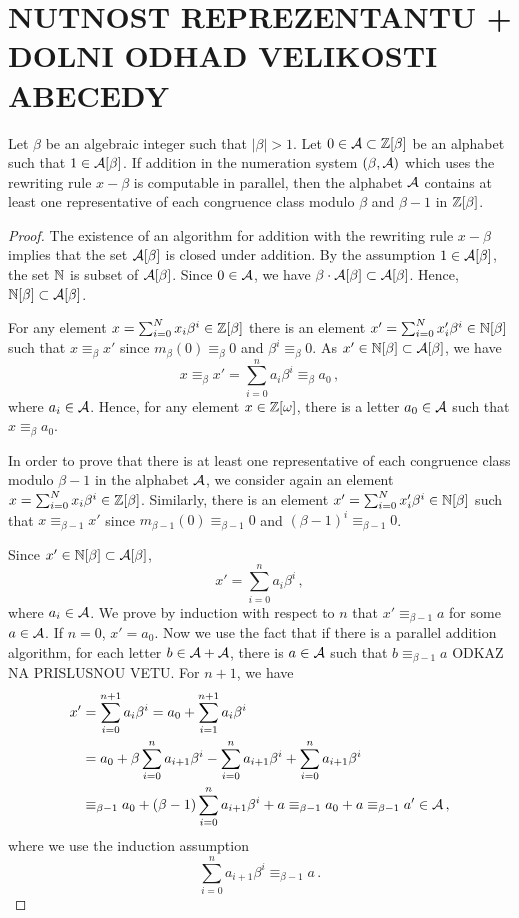 
\section{NUTNOST REPREZENTANTU + DOLNI ODHAD VELIKOSTI ABECEDY}
\begin{thm}
Let $\beta$ be an algebraic integer such that $|\beta|>1$. Let $0\in \mathcal{A}\subset \mathbb{Z}[\beta]$ be an alphabet such that $1\in \mathcal{A}[\beta]$. If addition in the numeration system $(\beta, \mathcal{A})$ which uses the rewriting rule $x-\beta$ is computable in parallel, then the alphabet $\mathcal{A}$ contains at least one representative of each congruence class modulo $\beta$ and $\beta-1$ in $\mathbb{Z}[\beta]$. 
\label{thm:representativesInAlphabet}
\end{thm}
\begin{proof}
The existence of an algorithm for addition with the rewriting rule $x-\beta$ implies that the set $\mathcal{A}[\beta]$ is closed under addition. By the assumption $1\in \mathcal{A}[\beta]$, the set $\mathbb{N}$ is subset of  $\mathcal{A}[\beta]$. Since $0\in\mathcal{A}$, we have $\beta \cdot \mathcal{A}[\beta] \subset \mathcal{A}[\beta]$. Hence, $\mathbb{N}[\beta] \subset \mathcal{A}[\beta]$.

For any element  $x=\sum_{i=0}^N x_i \beta^i\in \mathbb{Z}[\beta]$ there is an element $x'=\sum_{i=0}^N x'_i \beta^i\in \mathbb{N}[\beta]$ such that $x\equiv_\beta x'$  since $m_\beta (0)\equiv_\beta 0$ and $\beta^i\equiv_\beta 0$. As $x'\in \mathbb{N}[\beta] \subset \mathcal{A}[\beta]$, we have
$$
x\equiv_\beta x'=\sum_{i=0}^{n}a_i\beta^i \equiv_\beta a_0\,,
$$
where $a_i\in \mathcal{A}$. Hence, for any element $x\in\mathbb{Z}[\omega]$, there is a letter $a_0\in\mathcal{A}$ such that $x\equiv_\beta a_0$.

In order to prove that there is at least one representative of each congruence class modulo $\beta-1$ in the alphabet $\mathcal{A}$, we consider again an element $x=\sum_{i=0}^N x_i \beta^i\in \mathbb{Z}[\beta]$. Similarly, there is an element $x'=\sum_{i=0}^N x'_i \beta^i\in \mathbb{N}[\beta]$ such that $x\equiv_{\beta-1} x'$  since $m_{\beta-1} (0)\equiv_{\beta-1} 0$ and $(\beta-1)^i\equiv_{\beta-1} 0$.

Since $x'\in \mathbb{N}[\beta]\subset \mathcal{A}[\beta]$,
$$
x'=\sum_{i=0}^{n}a_i\beta^i\,,
$$
where $a_i\in \mathcal{A}$. We prove by induction with respect to $n$ that $x'\equiv_{\beta-1} a$ for some $a\in\mathcal{A}$.
If $n=0$, $x'=a_0$. Now we use the fact that if there is a parallel addition algorithm, for each letter $b \in\mathcal{A}+\mathcal{A}$, there is $a\in\mathcal{A}$ such that $b \equiv_{\beta-1} a$ ODKAZ NA PRISLUSNOU VETU. For $n+1$, we have
\begin{align*}
x'&=\sum_{i=0}^{n+1}a_i\beta^i =a_0 + \sum_{i=1}^{n+1}a_{i}\beta^i\\
    &=a_0 + \beta \sum_{i=0}^{n}a_{i+1}\beta^i - \sum_{i=0}^{n}a_{i+1}\beta^i+ \sum_{i=0}^{n}a_{i+1}\beta^i \\
    &\equiv_{\beta-1} a_0 + (\beta-1)\sum_{i=0}^{n}a_{i+1}\beta^i + a \equiv_{\beta-1}a_0 +a \equiv_{\beta-1}a' \in\mathcal{A}\,,
\end{align*}
where we use the induction assumption
$$
\sum_{i=0}^{n}a_{i+1}\beta^i\equiv_{\beta-1} a\,.
$$
\end{proof}


